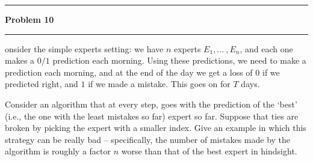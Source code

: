 \documentclass[11pt]{article}
\newcommand\question[2]{\vspace{.25in}\hrule\textbf{#1}\vspace{.5em}\hrule\vspace{.10in}}
\begin{document}
\raggedright

\newcommand\NAME{Jake Pitkin}
\newcommand\UID{u0891770}
\newcommand\HWNUM{3}

\question{Problem 10}

Consider the simple experts setting: we have $n$ experts $E_1, ... \ ,E_n$, and each one makes a $0/1$ prediction each morning. Using these predictions, we need to make a prediction each morning, and at the end of the day we get a loss of $0$ if we predicted right, and $1$ if we made a mistake. This goes on for $T$ days.

Consider an algorithm that at every step, goes with the prediction of the `best' (i.e., the one with the least mistakes so far) expert so far. Suppose that ties are broken by picking the expert with a smaller index. Give an example in which this strategy can be really bad -- specifically, the number of mistakes made by the algorithm is roughly a factor $n$ worse than that of the best expert in hindsight.
\end{document}
